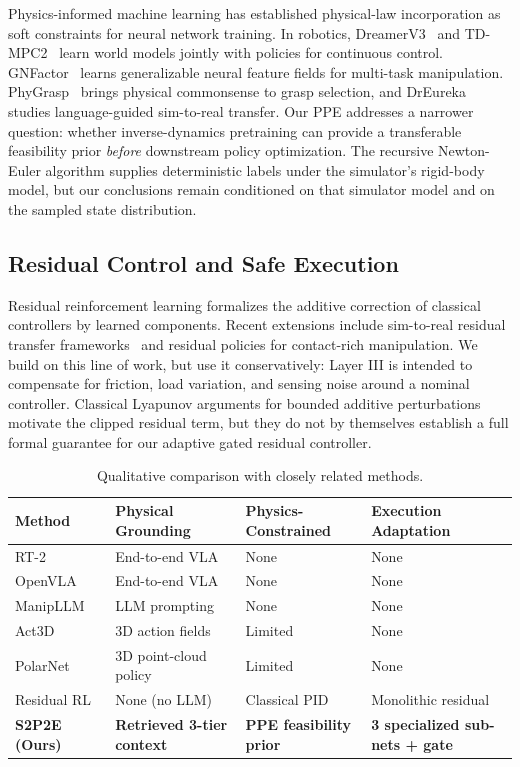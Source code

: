 \documentclass[12pt]{article}
\begin{document}
Physics-informed machine learning has established physical-law incorporation as soft constraints for neural network training. In robotics, DreamerV3~\cite{hafner2023dreamerv3} and TD-MPC2~\cite{hansen2024tdmpc2} learn world models jointly with policies for continuous control. GNFactor~\cite{ze2023gnfactor} learns generalizable neural feature fields for multi-task manipulation. PhyGrasp~\cite{xiang2024phygrasp} brings physical commonsense to grasp selection, and DrEureka~\cite{ma2024dreureka} studies language-guided sim-to-real transfer. Our PPE addresses a narrower question: whether inverse-dynamics pretraining can provide a transferable feasibility prior \emph{before} downstream policy optimization. The recursive Newton-Euler algorithm supplies deterministic labels under the simulator's rigid-body model, but our conclusions remain conditioned on that simulator model and on the sampled state distribution.

\subsection{Residual Control and Safe Execution}

Residual reinforcement learning formalizes the additive correction of classical controllers by learned components. Recent extensions include sim-to-real residual transfer frameworks~\cite{ma2024dreureka} and residual policies for contact-rich manipulation. We build on this line of work, but use it conservatively: Layer III is intended to compensate for friction, load variation, and sensing noise around a nominal controller. Classical Lyapunov arguments for bounded additive perturbations motivate the clipped residual term, but they do not by themselves establish a full formal guarantee for our adaptive gated residual controller.

\begin{table}[!htbp]
\centering
\caption{Qualitative comparison with closely related methods.}
\label{tab:comparison}
\small\setlength{\tabcolsep}{4pt}
\begin{tabular}{@{}L{0.20\textwidth} L{0.22\textwidth} L{0.22\textwidth} L{0.22\textwidth}@{}}
\toprule
Method & Physical Grounding & Physics-Constrained & Execution Adaptation \\
\midrule
RT-2~\cite{brohan2023rt2} & End-to-end VLA & None & None \\
OpenVLA~\cite{kim2024openvla} & End-to-end VLA & None & None \\
ManipLLM~\cite{li2024manipllm} & LLM prompting & None & None \\
Act3D~\cite{gervet2023act3d} & 3D action fields & Limited & None \\
PolarNet~\cite{chen2023polarnet} & 3D point-cloud policy & Limited & None \\
Residual RL & None (no LLM) & Classical PID & Monolithic residual \\
\midrule
\textbf{S2P2E (Ours)} & \textbf{Retrieved 3-tier context} & \textbf{PPE feasibility prior} & \textbf{3 specialized sub-nets + gate} \\
\bottomrule
\end{tabular}
\end{table}
\end{document}
